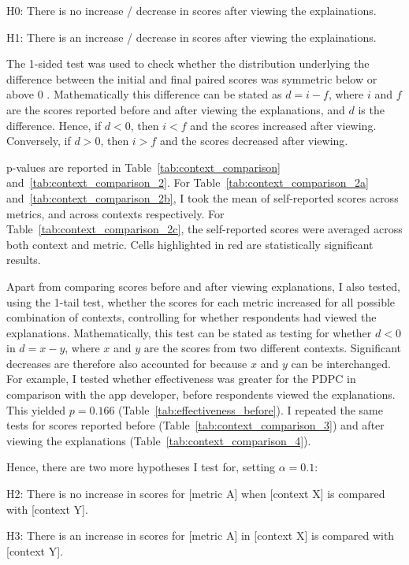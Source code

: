 \bigskip
\noindent H0: There is no increase / decrease in scores after viewing the explainations.

\bigskip

\noindent H1: There is an increase / decrease in scores after viewing the explainations.
\bigskip

The 1-sided test was used to check whether the distribution underlying the difference between the initial and final paired scores was symmetric below or above 0 \cite{scipy}. Mathematically this difference can be stated as $d = i - f$, where $i$ and $f$ are the scores reported before and after viewing the explanations, and $d$ is the difference. Hence, if $d < 0$, then $i < f$ and the scores increased after viewing. Conversely, if $d > 0$, then $i > f$ and the scores decreased after viewing. 

p-values are reported in Table~\ref{tab:context_comparison} and~\ref{tab:context_comparison_2}. For Table~\ref{tab:context_comparison_2a} and~\ref{tab:context_comparison_2b}, I took the mean of self-reported scores across metrics, and across contexts respectively. For Table~\ref{tab:context_comparison_2c}, the self-reported scores were averaged across both context and metric. Cells highlighted in red are statistically significant results. 

Apart from comparing scores before and after viewing explanations, I also tested, using the 1-tail test, whether the scores for each metric increased for all possible combination of contexts, controlling for whether respondents had viewed the explanations. Mathematically, this test can be stated as testing for whether $d < 0$ in $d = x - y$, where $x$ and $y$ are the scores from two different contexts. Significant decreases are therefore also accounted for because $x$ and $y$ can be interchanged. For example, I tested whether effectiveness was greater for the PDPC in comparison with the app developer, before respondents viewed the explanations. This yielded $p = 0.166$ (Table~\ref{tab:effectiveness_before}). I repeated the same tests for scores reported before (Table~\ref{tab:context_comparison_3}) and after viewing the explanations (Table~\ref{tab:context_comparison_4}).

Hence, there are two more hypotheses I test for, setting $\alpha = 0.1$:

\bigskip
\noindent H2: There is no increase in scores for [metric A] when [context X] is compared with [context Y].

\bigskip

\noindent H3: There is an increase in scores for [metric A] in [context X] is compared with [context Y].
\bigskip

